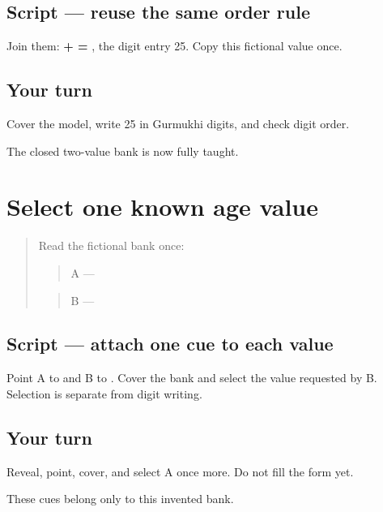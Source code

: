 \subsection*{Script — reuse the same order rule}
Join them: \textbf{ +  = }, the digit entry 25. Copy this fictional value once.

\subsection*{Your turn}
Cover the model, write 25 in Gurmukhi digits, and check digit order.

\begin{tcolorbox}[breakable,colback=teal!4,colframe=teal!35!black,title={Before you move on}]
The closed two-value bank is now fully taught.
\end{tcolorbox}
\section[A / B (two fictional age cues)]{Select one known age value}

\label{lesson:PA-W07-age-select}



\begin{quote}
Read the fictional bank once:

\begin{quote}
A — \textbf{}
\end{quote}

\begin{quote}
B — \textbf{}
\end{quote}
\end{quote}

\subsection*{Script — attach one cue to each value}
Point A to \textbf{} and B to \textbf{}. Cover the bank and select the value requested by B. Selection is separate from digit writing.

\subsection*{Your turn}
Reveal, point, cover, and select A once more. Do not fill the form yet.

\begin{tcolorbox}[breakable,colback=teal!4,colframe=teal!35!black,title={Before you move on}]
These cues belong only to this invented bank.
\end{tcolorbox}
